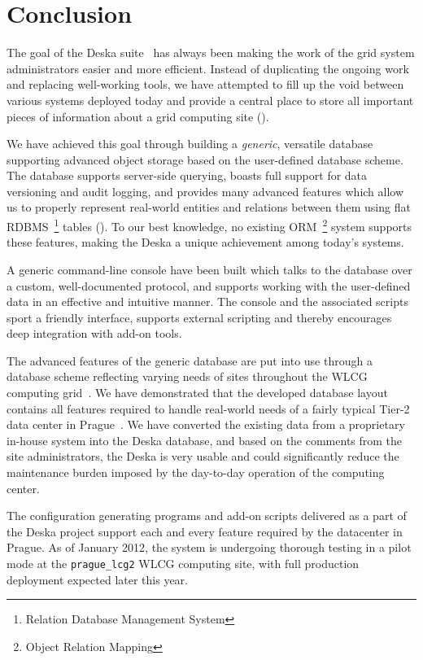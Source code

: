 \documentclass[deska]{subfiles}
\begin{document}
\chapter{Conclusion}
\label{sec:conclusion}

The goal of the Deska suite~\cite{deska-project} has always been making the work of the grid system administrators
easier and more efficient.  Instead of duplicating the ongoing work and replacing well-working tools, we have attempted
to fill up the void between various systems deployed today and provide a central place to store all important pieces of
information about a grid computing site ().

We have achieved this goal through building a {\em generic}, versatile database supporting advanced object storage based
on the user-defined database scheme.  The database supports server-side querying, boasts full support for data
versioning and audit logging, and provides many advanced features which allow us to properly represent real-world
entities and relations between them using flat RDBMS~\footnote{Relation Database Management System} tables
().  To our best knowledge, no existing ORM~\footnote{Object Relation Mapping} system
supports these features, making the Deska a unique achievement among today's systems.

A generic command-line console have been built which talks to the database over a custom, well-documented protocol, and
supports working with the user-defined data in an effective and intuitive manner.  The console and the associated
scripts sport a friendly interface, supports external scripting and thereby encourages deep integration with add-on
tools.

The advanced features of the generic database are put into use through a database scheme reflecting varying needs of
sites throughout the WLCG computing grid~\cite{wlcg}.  We have demonstrated that the developed database layout contains
all features required to handle real-world needs of a fairly typical Tier-2 data center in Prague~\cite{farm}.  We have
converted the existing data from a proprietary in-house system into the Deska database, and based on the comments from
the site administrators, the Deska is very usable and could significantly reduce the maintenance burden imposed by the
day-to-day operation of the computing center.

The configuration generating programs and add-on scripts delivered as a part of the Deska project support each and every
feature required by the datacenter in Prague.  As of January 2012, the system is undergoing thorough testing in a pilot
mode at the {\tt prague\_lcg2} WLCG computing site, with full production deployment expected later this year.
\end{document}

